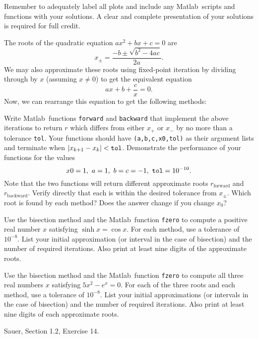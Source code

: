 \documentclass[12pt]{exam}
\newcommand{\matlab}{{\sc Matlab}}
\begin{document}
Remember to adequately label all plots and include any \matlab~scripts and functions with your solutions. A clear and complete presentation of your solutions is required for full credit.
\begin{questions}

\question The roots of the quadratic equation $ax^2+bx+c = 0$ are
\[x_\pm = \frac{-b \pm \sqrt{b^2-4ac}}{2a} .\]
We may also approximate these roots using fixed-point iteration by dividing through by $x$ (assuming $x \neq 0$) to get the equivalent equation
\[ax+b+\frac{c}{x} = 0.\]
Now, we can rearrange this equation to get the following methods:
Write \matlab~functions \verb$forward$ and \verb$backward$ that implement the above iterations to return $r$ which differs from either $x_+$ or $x_-$ by no more than a tolerance \verb$tol$. Your functions should have \verb$(a,b,c,x0,tol)$ as their argument lists and terminate when $|x_{k+1}-x_k| < \text{\texttt{tol}}$. Demonstrate the performance of your functions for the values
\[x0 = 1,\ a = 1,\ b = c = -1,\ \text{\texttt{tol}} = 10^{-10}.\]
Note that the two functions will return different approximate roots $r_\text{forward}$ and $r_\text{backward}$. Verify directly that each is within the desired tolerance from $x_\pm$. Which root is found by each method? Does the answer change if you change $x_0$?

\question Use the bisection method and the \matlab~function \verb$fzero$ to compute a positive real number $x$ satisfying $\sinh x = \cos x$. For each method, use a tolerance of $10^{-8}$. List your initial approximation (or interval in the case of bisection) and the number of required iterations. Also print at least nine digits of the approximate roots.

\question Use the bisection method and the \matlab~function \verb$fzero$ to compute all three real numbers $x$ satisfying $5x^2-e^x = 0$. For each of the three roots and each method, use a tolerance of $10^{-8}$. List your initial approximations (or intervals in the case of bisection) and the number of required iterations. Also print at least nine digits of each approximate roots.

\question Sauer, Section 1.2, Exercise 14.

\end{questions}
\end{document}
